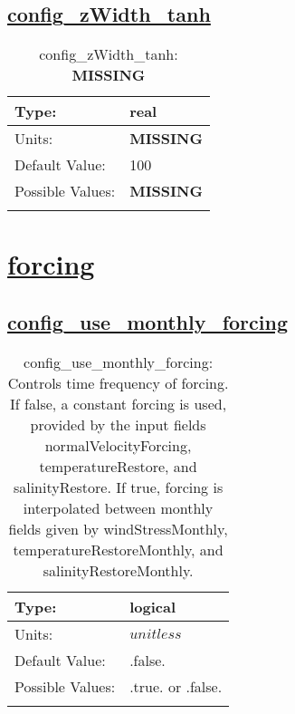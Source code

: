 \subsection[config\_zWidth\_tanh]{\hyperref[sec:nm_tab_vmix_tanh]{config\_zWidth\_tanh}}
\label{subsec:nm_sec_config_zWidth_tanh}
\begin{center}
\begin{longtable}{| p{2.0in} | p{4.0in} |}
    \hline
    Type: & real \\
    \hline
    Units: & {\bf \color{red} MISSING} \\
    \hline
    Default Value: & 100 \\
    \hline
    Possible Values: & {\bf \color{red} MISSING} \\
    \hline
    \caption{config\_zWidth\_tanh: {\bf \color{red} MISSING}}
\end{longtable}
\end{center}
\section[forcing]{\hyperref[sec:nm_tab_forcing]{forcing}}
\label{sec:nm_sec_forcing}
\subsection[config\_use\_monthly\_forcing]{\hyperref[sec:nm_tab_forcing]{config\_use\_monthly\_forcing}}
\label{subsec:nm_sec_config_use_monthly_forcing}
\begin{center}
\begin{longtable}{| p{2.0in} | p{4.0in} |}
    \hline
    Type: & logical \\
    \hline
    Units: & $unitless$ \\
    \hline
    Default Value: & .false. \\
    \hline
    Possible Values: & .true. or .false. \\
    \hline
    \caption{config\_use\_monthly\_forcing: Controls time frequency of forcing.  If false, a constant forcing is used, provided by the input fields normalVelocityForcing, temperatureRestore, and salinityRestore.  If true, forcing is interpolated between monthly fields given by windStressMonthly, temperatureRestoreMonthly, and salinityRestoreMonthly.}
\end{longtable}
\end{center}
